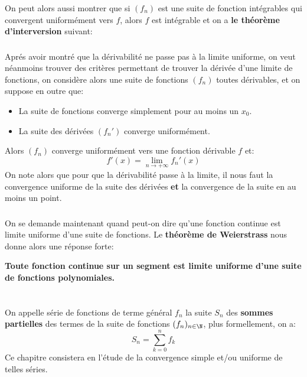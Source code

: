 \subsection*{}
On peut alors aussi montrer que si \((f_n)\) est une suite de fonction intégrables qui convergent uniformément vers \(f\), alors \(f\) est intégrable et on a \textbf{le théorème d'interversion} suivant:
\subsection*{}
Aprés avoir montré que la dérivabilité ne passe pas à la limite uniforme, on veut néanmoins trouver des critères permettant de trouver la dérivée d'une limite de fonctions, on considère alors une suite de fonctions \((f_n)\) toutes dérivables, et on suppose en outre que:
\begin{itemize}
   \item La suite de fonctions converge simplement pour au moins un \(x_0\).
   \item La suite des dérivées \((f_n')\) converge uniformément.
\end{itemize}
Alors \((f_n)\) converge uniformément vers une fonction dérivable \(f\) et:
\[
   f'(x) = \lim_{n \rightarrow +\infty} f_n'(x)
\] 
On note alors que pour que la dérivabilité passe à la limite, il nous faut la convergence uniforme de la suite des dérivées \textbf{et} la convergence de la suite en au moins un point.
\subsection*{}
On se demande maintenant quand peut-on dire qu'une fonction continue est limite uniforme d'une suite de fonctions. Le \textbf{théorème de Weierstrass} nous donne alors une réponse forte:
\begin{center}
   \textbf{Toute fonction continue sur un segment est limite uniforme d'une suite de fonctions polynomiales.}
\end{center}

\chapter*{}
On appelle série de fonctions de terme général \(f_n\) la suite \(S_n\) des \textbf{sommes partielles} des termes de la suite de fonctions \((f_n)_{n\in\N}\), plus formellement, on a:
\[
   S_n = \sum_{k=0}^{n} f_k   
\]
Ce chapitre consistera en l'étude de la convergence simple et/ou uniforme de telles séries. 
